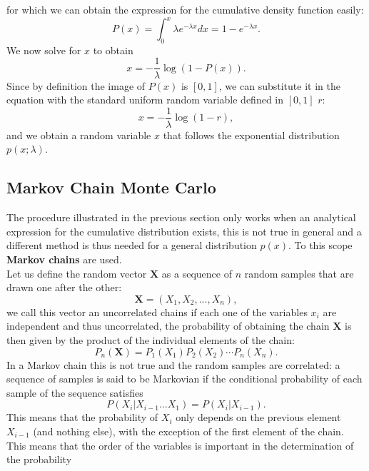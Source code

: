 for which we can obtain the expression for the cumulative density function easily:
\begin{equation}
    P(x)=\int_{0}^{x}\lambda e^{-\lambda x}dx = 1-e^{-\lambda x}.
\end{equation}
We now solve for $x$ to obtain
\begin{equation}
    x=-\frac{1}{\lambda}\log{(1-P(x))}.
\end{equation}
Since by definition the image of $P(x)$ is $[0,1]$, we can substitute it in the equation with the standard uniform random variable defined 
in $[0,1]$ $r$:
\begin{equation}
    x=-\frac{1}{\lambda}\log{(1-r)},
\end{equation}
and we obtain a random variable $x$ that follows the exponential distribution $p(x;\lambda)$.
\subsection{Markov Chain Monte Carlo}
The procedure illustrated in the previous section only works when an analytical expression for the cumulative distribution exists, 
this is not true in general and a different method is thus needed for a general distribution $p(x)$. To this scope \textbf{Markov chains} are 
used.\\
Let us define the random vector $\mathbf{X}$ as a sequence of $n$ random samples that are drawn one after the other:
\begin{equation}
    \mathbf{X}=\left(X_1,X_2,...,X_n\right),
\end{equation}
we call this vector an uncorrelated chains if each one of the variables $x_i$ are independent and thus uncorrelated, the probability of 
obtaining the chain $\mathbf{X}$ is then given by the product of the individual elements of the chain:
\begin{equation}
    P_n(\mathbf{X})=P_1(X_1)P_2(X_2)\cdots P_n(X_n).
\end{equation}
In a Markov chain this is not true and the random samples are correlated: a sequence of samples is said to be Markovian if the conditional 
probability of each sample of the sequence satisfies
\begin{equation}
    P(X_i|X_{i-1}...X_1)=P(X_i|X_{i-1}).
\end{equation}
This means that the probability of $X_i$ only depends on the previous element $X_{i-1}$ (and nothing else), with the exception of the first 
element of the chain. This means that the order of the variables is important in the determination of the probability 
